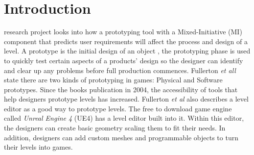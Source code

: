 \documentclass[journal]{IEEEtran}
\begin{document}
\section{Introduction} \label{intro}
 research project looks into how a prototyping tool with a Mixed-Initiative (MI) component that predicts user requirements will affect the process and design of a level. A prototype is the initial design of an object \cite{prototype}, the prototyping phase is used to quickly test certain aspects of a products' design so the designer can identify and clear up any problems before full production commences\cite{budde1992prototyping}. Fullerton \textit{et all} \cite[p.~150]{fullerton2004game} state there are two kinds of prototyping in games: Physical and Software prototypes. Since the books publication in 2004, the accessibility of tools that help designers prototype levels has increased. Fullerton \textit{et al} \cite[p.~164]{fullerton2004game} also describes a level editor as a good way to prototype levels. The free to download game engine called \textit{Unreal Engine 4} (UE4) has a level editor built into it. Within this editor, the designers can create basic geometry scaling them to fit their needs. In addition, designers can add custom meshes and programmable objects to turn their levels into games.
\end{document}
